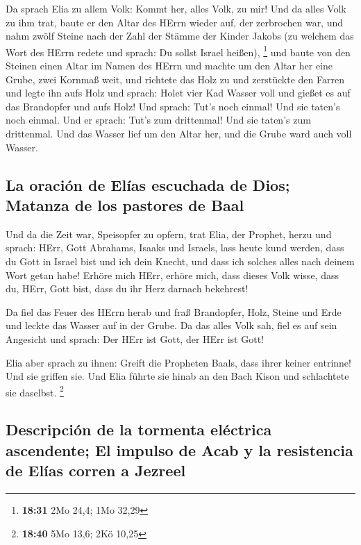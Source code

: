  Da sprach Elia zu allem Volk: Kommt her, alles Volk, zu
mir! Und da alles Volk zu ihm trat, baute er den Altar des HErrn wieder
auf, der zerbrochen war,  und nahm zwölf Steine nach der
Zahl der Stämme der Kinder Jakobs (zu welchem das Wort des HErrn redete
und sprach: Du sollst Israel heißen), \footnote{\textbf{18:31} 2Mo 24,4;
  1Mo 32,29}  und baute von den Steinen einen Altar im
Namen des HErrn und machte um den Altar her eine Grube, zwei Kornmaß
weit,  und richtete das Holz zu und zerstückte den Farren
und legte ihn aufs Holz  und sprach: Holet vier Kad
Wasser voll und gießet es auf das Brandopfer und aufs Holz! Und sprach:
Tut's noch einmal! Und sie taten's noch einmal. Und er sprach: Tut's zum
drittenmal! Und sie taten's zum drittenmal.  Und das
Wasser lief um den Altar her, und die Grube ward auch voll Wasser.

\hypertarget{la-oraciuxf3n-de-eluxedas-escuchada-de-dios-matanza-de-los-pastores-de-baal}{%
\subsection{La oración de Elías escuchada de Dios; Matanza de los
pastores de
Baal}\label{la-oraciuxf3n-de-eluxedas-escuchada-de-dios-matanza-de-los-pastores-de-baal}}

 Und da die Zeit war, Speisopfer zu opfern, trat Elia,
der Prophet, herzu und sprach: HErr, Gott Abrahams, Isaaks und Israels,
lass heute kund werden, dass du Gott in Israel bist und ich dein Knecht,
und dass ich solches alles nach deinem Wort getan habe! 
Erhöre mich HErr, erhöre mich, dass dieses Volk wisse, dass du, HErr,
Gott bist, dass du ihr Herz darnach bekehrest!

 Da fiel das Feuer des HErrn herab und fraß Brandopfer,
Holz, Steine und Erde und leckte das Wasser auf in der Grube.
 Da das alles Volk sah, fiel es auf sein Angesicht und
sprach: Der HErr ist Gott, der HErr ist Gott!

 Elia aber sprach zu ihnen: Greift die Propheten Baals,
dass ihrer keiner entrinne! Und sie griffen sie. Und Elia führte sie
hinab an den Bach Kison und schlachtete sie daselbst. \footnote{\textbf{18:40}
  5Mo 13,6; 2Kö 10,25}

\hypertarget{descripciuxf3n-de-la-tormenta-eluxe9ctrica-ascendente-el-impulso-de-acab-y-la-resistencia-de-eluxedas-corren-a-jezreel}{%
\subsection{Descripción de la tormenta eléctrica ascendente; El impulso
de Acab y la resistencia de Elías corren a
Jezreel}\label{descripciuxf3n-de-la-tormenta-eluxe9ctrica-ascendente-el-impulso-de-acab-y-la-resistencia-de-eluxedas-corren-a-jezreel}}

